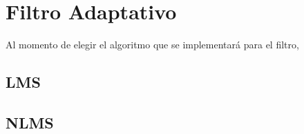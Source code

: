 \section{Filtro Adaptativo}
Al momento de elegir el algoritmo que se implementará para el filtro, 
\subsection{LMS}
\subsection{NLMS}